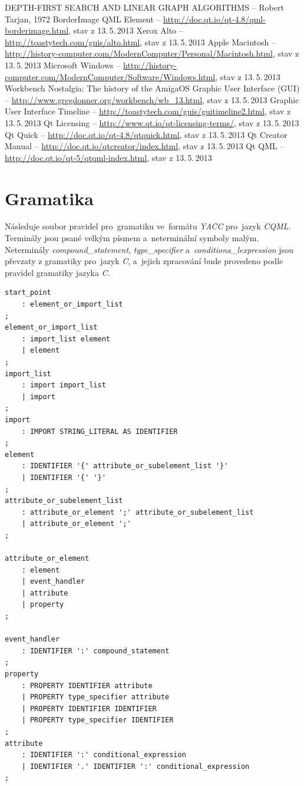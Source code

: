\documentclass[11pt,twoside,a4paper]{book}
\begin{document}
\begin{thebibliography}{99}
 DEPTH-FIRST SEARCH AND LINEAR GRAPH ALGORITHMS -- Robert Tarjan, 1972 BorderImage QML Element -- \url{http://doc.qt.io/qt-4.8/qml-borderimage.html}, stav z 13.\,5.\,2013
 Xerox Alto -- \url{http://toastytech.com/guis/alto.html}, stav z 13.\,5.\,2013
 Apple Macintosh -- \url{http://history-computer.com/ModernComputer/Personal/Macintosh.html}, stav z 13.\,5.\,2013
 Microsoft Windows -- \url{http://history-computer.com/ModernComputer/Software/Windows.html}, stav z 13.\,5.\,2013
 Workbench Nostalgia: The history of the AmigaOS Graphic User Interface (GUI) -- \url{http://www.gregdonner.org/workbench/wb_13.html}, stav z 13.\,5.\,2013
 Graphic User Interface Timeline -- \url{http://toastytech.com/guis/guitimeline2.html}, stav z 13.\,5.\,2013
 Qt Licensing -- \url{http://www.qt.io/qt-licensing-terms/}, stav z 13.\,5.\,2013
 Qt Quick -- \url{http://doc.qt.io/qt-4.8/qtquick.html}, stav z 13.\,5.\,2013
 Qt Creator Manual -- \url{http://doc.qt.io/qtcreator/index.html}, stav z 13.\,5.\,2013
 Qt QML -- \url{http://doc.qt.io/qt-5/qtqml-index.html}, stav z 13.\,5.\,2013
\end{thebibliography}


\appendix
\chapter{\label{CH:APA}Gramatika}
Následuje soubor pravidel pro~gramatiku ve~formátu \textit{YACC} pro~jazyk \textit{CQML}. Terminály jsou psané velkým písmem a~neterminální symboly malým. Neterminály \textit{compound\_statement}, \textit{type\_specifier} a~\textit{conditiona\_lexpression} jsou převzaty z gramatiky pro~jazyk \textit{C}, a~jejich zpracování bude provedeno podle pravidel gramatiky jazyka \textit{C}.
\begin{lstlisting}[float,frame=single,caption=Gramatika jazyka \textit{CQML},label=lst:g]
start_point
	: element_or_import_list
;
element_or_import_list
	: import_list element
	| element
;
import_list
	: import import_list
	| import
;
import
	: IMPORT STRING_LITERAL AS IDENTIFIER
;
element
	: IDENTIFIER '{' attribute_or_subelement_list '}'
	| IDENTIFIER '{' '}'
;
attribute_or_subelement_list
	: attribute_or_element ';' attribute_or_subelement_list
	| attribute_or_element ';'
;

attribute_or_element
	: element
	| event_handler
	| attribute
	| property
;

event_handler
	: IDENTIFIER ':' compound_statement
;
property
	: PROPERTY IDENTIFIER attribute
	| PROPERTY type_specifier attribute
	| PROPERTY IDENTIFIER IDENTIFIER
	| PROPERTY type_specifier IDENTIFIER
;
attribute
	: IDENTIFIER ':' conditional_expression
	| IDENTIFIER '.' IDENTIFIER ':' conditional_expression
;
\end{lstlisting}
\end{document}
